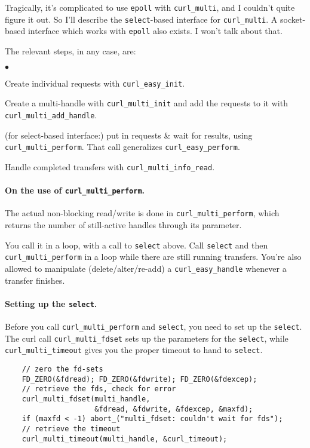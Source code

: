 \documentclass[11pt]{article}
\newcommand{\squishlist}{
 \begin{list}{$\bullet$}
  { \setlength{\itemsep}{0pt}
     \setlength{\parsep}{3pt}
     \setlength{\topsep}{3pt}
     \setlength{\partopsep}{0pt}
     \setlength{\leftmargin}{1.5em}
     \setlength{\labelwidth}{1em}
     \setlength{\labelsep}{0.5em} } }
\newcommand{\squishend}{
  \end{list}  }
\begin{document}
Tragically, it's complicated to use {\tt epoll} with {\tt curl\_multi}, and I couldn't
quite figure it out. So I'll describe the {\tt select}-based interface for {\tt curl\_multi}.
A socket-based interface which works with {\tt epoll} also exists. I won't talk about that.

The relevant steps, in any case, are:
\squishlist
\item Create individual requests with {\tt curl\_easy\_init}.
\item Create a multi-handle with {\tt curl\_multi\_init} and add the requests to it
with {\tt curl\_multi\_add\_handle}.
\item (for select-based interface:) put in requests \& wait for results, using {\tt 
curl\_multi\_perform}. That call generalizes {\tt curl\_easy\_perform}.
\item Handle completed transfers with {\tt curl\_multi\_info\_read}.
\squishend

\paragraph{On the use of {\tt curl\_multi\_perform}.} The actual non-blocking read/write
is done in {\tt curl\_multi\_perform}, which returns the number of still-active handles 
through its parameter.

You call it in a loop, with a call to {\tt select} above. Call {\tt select} and then
{\tt curl\_multi\_perform} in a loop while there are still running transfers.
You're also allowed to manipulate (delete/alter/re-add) a {\tt curl\_easy\_handle} whenever
a transfer finishes.

\paragraph{Setting up the {\tt select}.} Before you call {\tt curl\_multi\_perform}
and {\tt select}, you need to set up the {\tt select}. The curl call {\tt curl\_multi\_fdset}
sets up the parameters for the {\tt select}, while {\tt curl\_multi\_timeout} gives you
the proper timeout to hand to {\tt select}.

\begin{lstlisting}
    // zero the fd-sets
    FD_ZERO(&fdread); FD_ZERO(&fdwrite); FD_ZERO(&fdexcep);
    // retrieve the fds, check for error
    curl_multi_fdset(multi_handle, 
                     &fdread, &fdwrite, &fdexcep, &maxfd);
    if (maxfd < -1) abort_("multi_fdset: couldn't wait for fds");
    // retrieve the timeout
    curl_multi_timeout(multi_handle, &curl_timeout);
\end{lstlisting}
\end{document}
